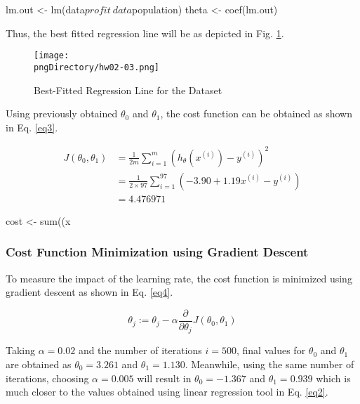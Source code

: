 \documentclass[12pt,letterpaper,twoside]{article}
\begin{document}
\begin{terminal}
lm.out <- lm(data$profit ~ data$population)
theta <- coef(lm.out)
\end{terminal}

Thus, the best fitted regression line will be as depicted in Fig. \ref{fig2}.

\begin{figure}[H]\centering
\texttt{[image: \\pngDirectory/hw02-03.png]}
\caption{Best-Fitted Regression Line for the Dataset}\label{fig2}
\end{figure}

Using previously obtained $\theta_0$ and $\theta_1$, the cost function can be obtained as shown in Eq. \ref{eq3}.

\begin{equation}\label{eq3}
\begin{split}
J(\theta_0, \theta_1) & = \frac{1}{2m}\sum\limits_{i=1}^m \left(h_{\theta}(x^{(i)})-y^{(i)}\right)^{2} \\
 & = \frac{1}{2 \times 97}\sum\limits_{i=1}^{97} \left({-3.90} + {1.19}x^{(i)} - y^{(i)}\right)\\
 & = 4.476971
\end{split}
\end{equation}

\begin{terminal}
cost <- sum((x%
\end{terminal}

\subsubsection*{Cost Function Minimization using Gradient Descent}

To measure the impact of the learning rate, the cost function is minimized using gradient descent as shown in Eq. \ref{eq4}.

\begin{equation}\label{eq4}
\theta_j := \theta_j - \alpha \frac{\partial}{\partial\theta_j}J(\theta_0, \theta_1)
\end{equation}

Taking $\alpha = 0.02$ and the number of iterations $i = 500$, final values for $\theta_0$ and $\theta_1$ are obtained as $\theta_0 = 3.261$ and $\theta_1 = 1.130$.
Meanwhile, using the same number of iterations, choosing $\alpha = 0.005$ will result in $\theta_0 = -1.367$ and $\theta_1 = 0.939$ which is much closer to the values obtained using linear regression tool in Eq. \ref{eq2}.
\end{document}
